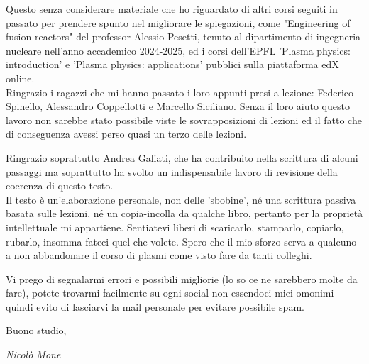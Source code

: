 \documentclass{book}
\begin{document}
Questo senza considerare materiale che ho riguardato di altri corsi seguiti in passato per prendere spunto nel migliorare le spiegazioni, come "Engineering of fusion reactors" del professor Alessio Pesetti, tenuto al dipartimento di ingegneria nucleare nell'anno accademico 2024-2025, ed i corsi dell'EPFL 'Plasma physics: introduction' e 'Plasma physics: applications' pubblici sulla piattaforma edX online.\\

Ringrazio i ragazzi che mi hanno passato i loro appunti presi a lezione: Federico Spinello, Alessandro Coppellotti e Marcello Siciliano. Senza il loro aiuto questo lavoro non sarebbe stato possibile viste le sovrapposizioni di lezioni ed il fatto che di conseguenza avessi perso quasi un terzo delle lezioni. 

Ringrazio soprattutto Andrea Galiati, che ha contribuito nella scrittura di alcuni passaggi ma soprattutto ha svolto un indispensabile lavoro di revisione della coerenza di questo testo.\\

Il testo è un'elaborazione personale, non delle 'sbobine', né una scrittura passiva basata sulle lezioni, né un copia-incolla da qualche libro, pertanto per la proprietà intellettuale mi appartiene. Sentiatevi liberi di scaricarlo, stamparlo, copiarlo, rubarlo, insomma fateci quel che volete. Spero che il mio sforzo serva a qualcuno a non abbandonare il corso di plasmi come visto fare da tanti colleghi.

Vi prego di segnalarmi errori e possibili migliorie (lo so ce ne sarebbero molte da fare), potete trovarmi facilmente su ogni social non essendoci miei omonimi quindi evito di lasciarvi la mail personale per evitare possibile spam.

Buono studio,    

\vspace{1cm}
\hfill \textit{Nicolò Mone}

\tableofcontents

\newpage


%
%













\end{document}
